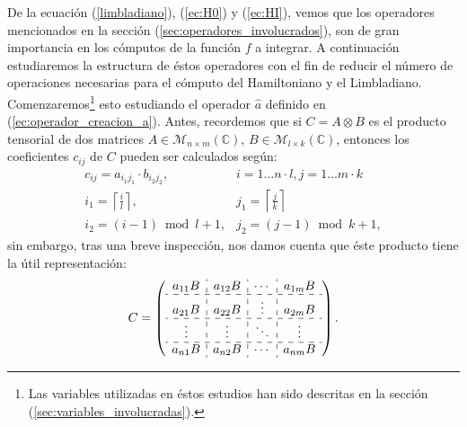 \quad De la ecuaci\'on (\ref{limbladiano}), (\ref{ec:H0}) y (\ref{ec:HI}), vemos que los operadores mencionados en la secci\'on (\ref{sec:operadores_involucrados}), son de gran importancia en los c\'omputos de la funci\'on $f$ a integrar. A continuaci\'on estudiaremos la estructura de \'estos operadores con el fin de reducir el n\'umero de operaciones necesarias para el c\'omputo del Hamiltoniano y el Limbladiano. Comenzaremos\footnote{Las variables utilizadas en \'estos estudios han sido descritas en la secci\'on (\ref{sec:variables_involucradas}).} esto estudiando el operador $\hat{a}$ definido en (\ref{ec:operador_creacion_a}). Antes, recordemos que si $C=A\otimes B$ es el producto tensorial de dos matrices $A\in\mathcal{M}_{n\times m}(\mathbb{C})$, $B\in\mathcal{M}_{l\times k}(\mathbb{C})$, entonces los coeficientes $c_{ij}$ de $C$ pueden ser calculados seg\'un:\begin{equation}\label{ec:kron}
 \begin{array}{lll}
  c_{ij}=a_{i_1j_1}\cdot b_{i_2j_2}, & i=1\ldots n\cdot l,j=1\ldots m\cdot k\\
i_1=\left\lceil \frac{i}{l}\right\rceil, & j_1=\left\lceil \frac{j}{k}\right\rceil\\
i_2=(i-1)\bmod l+1, & j_2=(j-1)\bmod k+1,
 \end{array}
\end{equation}
sin embargo, tras una breve inspecci\'on, nos damos cuenta que \'este producto tiene la \'util representaci\'on:
\clearpage\begin{equation}\label{ec:kron_esquema}C=\left(
\begin{array}{c:c:c:c}
a_{11}B & a_{12}B & \cdots & a_{1m}B \\ \hdashline
a_{21}B & a_{22}B & \vdots & a_{2m}B \\ \hdashline
\vdots & \vdots & \ddots & \vdots \\ \hdashline
a_{n1}B & a_{n2}B & \cdots & a_{nm}B
\end{array}\right).
\end{equation}
